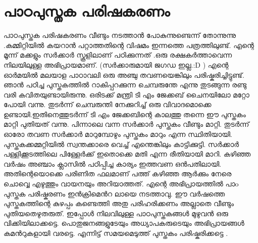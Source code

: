 \documentclass[10pt,a4paper]{report}
\begin{document}
 \section{  പാഠപുസ്തക പരിഷകരണം }
    പാഠപുസ്തക പരിഷകരണം വീണ്ടും നടത്താൻ പോകുന്നുണ്ടെന്ന് തോന്നുന്നു .കമ്മിറ്റിയിൽ കയറാൻ പറ്റാത്തതിന്റെ വിഷമം ഇന്നത്തെ പത്രത്തിലുണ്ട്. എന്റെ മൂന്ന് മക്കളും സർക്കാർ സ്കൂളിലാണ് പഠിക്കുന്നത് .ഒരു രക്ഷകർത്താവെന്ന നിലയിലുള്ള അഭിപ്രായമാണ്. (സർക്കാരുമായി ജഗഡ ഇല്ല.:D ) എന്റെ ഓർമയിൽ മലയാള പാഠാവലി ഒരു അഞ്ചു തവണയെങ്കിലും പരിഷ്കരിച്ചിട്ടുണ്ട്. ഞാൻ പഠിച്ച പുസ്തകത്തിൽ റാകിപ്പറക്കുന്ന ചെമ്പരുന്തേ എന്നു തുടങ്ങുന്ന രണ്ടു വരി കവിതയുണ്ടായിരുന്നു. ഒരിടക്ക് മന്ത്രി ടി എം ജേക്കബ് ചൈനയിലോ മറ്റോ പോയി വന്നു. തുടർന്ന് ചെമ്പരുന്തി നേക്കുറിച്ച് ഒരു വിവാദമൊക്കെ ഉണ്ടായി.ഇതിനെത്തുടർന്ന് ടി എം ജേക്കബിന്റെ കാലത്തു തന്നെ ഈ പുസ്തകം മാറ്റി പുതിയത് വന്നു. പിന്നാലെ വന്ന സർക്കാർ പുസ്തകം വീണ്ടും മാറ്റി. തുടർന്ന് ഓരോ തവണ സർക്കാർ മാറുമ്പോഴും പുസ്തകം മാറും എന്ന സ്ഥിതിയായി. പുസ്തകക്കമ്മറ്റിയിൽ സ്വന്തക്കാരെ വെച്ച് എന്തെങ്കിലും കാട്ടിക്കുട്ടി. സർക്കാർ പള്ളിക്കൂടത്തിലെ പിള്ളേർക്ക് ഇതൊക്കെ മതി എന്ന രീതിയായി മാറി. കഴിഞ്ഞ വർഷം അഞ്ചാം ക്ലാസിൽ പഠിപ്പിച്ച കാര്യം ഇത്തവണ ഒൻപതിലായി. അതിന്റെയൊക്കെ പരിണിത ഫലമാണ് പത്ത് കഴിഞ്ഞ ആർക്കും നേരെ ചൊവ്വെ എഴുത്തും വായനയും അറിയാത്തത്. എന്റെ അഭിപ്രായത്തിൽ പാo പുസ്തക പരിഷ്കരണം ഇൻക്രിമെൻറ ലായെ നടത്താവു. ഈ വർഷത്തെ പുസ്തകത്തിന്റെ കുഴപ്പം കണ്ടെത്തി അതു പരിഹരിക്കണം അല്ലാതെ വീണ്ടും പുതിയതെഴുതരുത്. ഇപ്പോൾ നിലവിലുള്ള പാഠപുസ്തകങ്ങൾ മുഴുവൻ ഒരു വിക്കിയിലാക്കട്ടെ. പൊതുജനങ്ങളുടേയും അധ്യാപകരുടെയും അഭിപ്രായങ്ങൾ കമൻറുകളായി വരട്ടെ. എന്നിട്ട് സമയമെടുത്ത് പുസ്തകം പരിഷ്കരിക്കട്ടെ .
    
\end{document}
